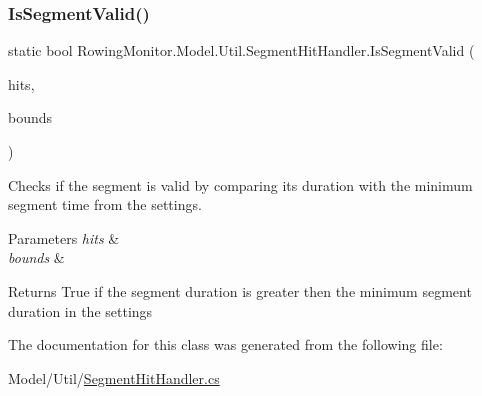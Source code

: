 \subsubsection{\texorpdfstring{Is\+Segment\+Valid()}{IsSegmentValid()}}
{\footnotesize\ttfamily static bool Rowing\+Monitor.\+Model.\+Util.\+Segment\+Hit\+Handler.\+Is\+Segment\+Valid (\begin{DoxyParamCaption}\item[{List$<$ \hyperlink{struct_rowing_monitor_1_1_model_1_1_util_1_1_segment_hit}{Segment\+Hit} $>$}]{hits,  }\item[{long \mbox{[}$\,$\mbox{]}}]{bounds }\end{DoxyParamCaption})\hspace{0.3cm}{\ttfamily [static]}}



Checks if the segment is valid by comparing its duration with the minimum segment time from the settings. 


\begin{DoxyParams}{Parameters}
{\em hits} & \\
\hline
{\em bounds} & \\
\hline
\end{DoxyParams}
\begin{DoxyReturn}{Returns}
True if the segment duration is greater then the minimum segment duration in the settings
\end{DoxyReturn}


The documentation for this class was generated from the following file\+:\begin{DoxyCompactItemize}
\item 
Model/\+Util/\hyperlink{_segment_hit_handler_8cs}{Segment\+Hit\+Handler.\+cs}\end{DoxyCompactItemize}
